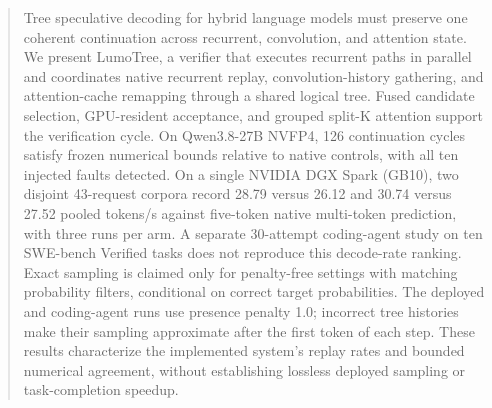 \begin{abstract}
Tree speculative decoding for hybrid language models must preserve one coherent continuation across recurrent, convolution, and attention state. We present LumoTree, a verifier that executes recurrent paths in parallel and coordinates native recurrent replay, convolution-history gathering, and attention-cache remapping through a shared logical tree. Fused candidate selection, GPU-resident acceptance, and grouped split-K attention support the verification cycle. On Qwen3.8-27B NVFP4, 126 continuation cycles satisfy frozen numerical bounds relative to native controls, with all ten injected faults detected. On a single NVIDIA DGX Spark (GB10), two disjoint 43-request corpora record 28.79 versus 26.12 and 30.74 versus 27.52 pooled tokens/s against five-token native multi-token prediction, with three runs per arm. A separate 30-attempt coding-agent study on ten SWE-bench Verified tasks does not reproduce this decode-rate ranking. Exact sampling is claimed only for penalty-free settings with matching probability filters, conditional on correct target probabilities. The deployed and coding-agent runs use presence penalty 1.0; incorrect tree histories make their sampling approximate after the first token of each step. These results characterize the implemented system's replay rates and bounded numerical agreement, without establishing lossless deployed sampling or task-completion speedup.
\end{abstract}
